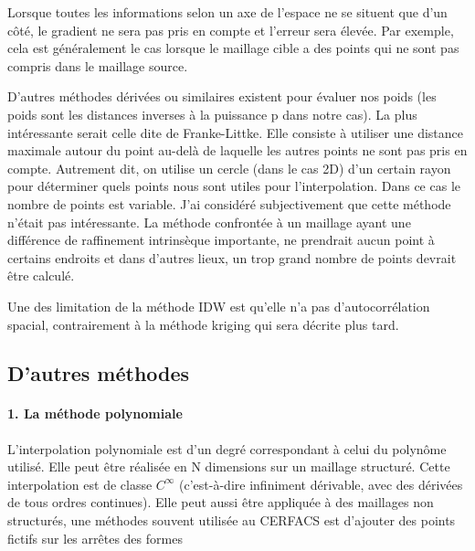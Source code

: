 Lorsque toutes les informations selon un axe de l'espace ne se situent que d'un côté, le gradient ne sera pas pris en compte et l'erreur sera élevée. Par exemple, cela est généralement le cas lorsque le maillage cible a des points qui ne sont pas compris dans le maillage source.

D'autres méthodes dérivées ou similaires existent pour évaluer nos poids (les poids sont les distances inverses à la puissance p dans notre cas). La plus intéressante serait celle dite de Franke-Littke. Elle consiste à utiliser une distance maximale autour du point au-delà de laquelle les autres points ne sont pas pris en compte. Autrement dit, on utilise un cercle (dans le cas 2D) d'un certain rayon pour déterminer quels points nous sont utiles pour l'interpolation. Dans ce cas le nombre de points est variable.
J'ai considéré subjectivement que cette méthode n'était pas intéressante. La méthode confrontée à un maillage ayant une différence de raffinement intrinsèque importante, ne prendrait aucun point à certains endroits et dans d'autres lieux, un trop grand nombre de points devrait être calculé.

Une des limitation\cite{idw-mapscaping} de la méthode IDW est qu'elle n'a pas d'autocorrélation spacial, contrairement à la méthode kriging qui sera décrite plus tard.

\vspace{0,5 cm}

\subsection{D'autres méthodes}
\paragraph{1. La méthode polynomiale}
\phantom{-}
\newline
L'interpolation polynomiale est d'un degré correspondant à celui du polynôme utilisé. Elle peut être réalisée en N dimensions sur un maillage structuré. Cette interpolation est de classe \(C^\infty\) (c'est-à-dire infiniment dérivable, avec des dérivées de tous ordres continues). Elle peut aussi être appliquée à des maillages non structurés, une méthodes souvent utilisée au CERFACS est d'ajouter des points fictifs sur les arrêtes des formes %

